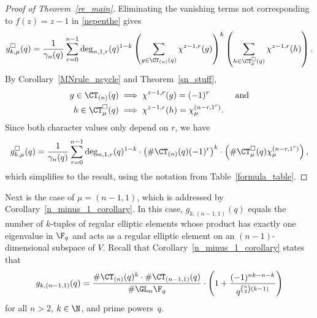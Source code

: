 \begin{proof}[Proof of Theorem~\ref{re_main}]
Eliminating the vanishing terms not corresponding to \(f(z) = z-1\) in \eqref{nepenthe} gives
\[
g_{k,\mu}^\Box (q)
=
\frac{1}{\gamma_n(q)}
\sum_{r = 0}^{n-1}
\deg_{n,1,r}(q)^{1-k}
\left (
\sum_{g \in \CT_{(n)} (q)} \chi^{z-1,r} (g)
\right )^k
\left (
\sum_{h \in \CT_\mu^\Box (q)} \chi^{z-1,r} (h)
\right ).
\]
By
Corollary~\ref{MNrule_ncycle}
and
Theorem~\ref{sn_stuff},
\begin{align*}
g \in \CT_{(n)} (q) & \implies \chi^{z-1,r}(g) = (-1)^r \quad \quad \quad \text{and}\\
h \in \CT_\mu^\Box (q)   & \implies \chi^{z-1,r}(h) = \chi^{(n-r,1^r)}_\mu.
\end{align*}
Since both character values only depend on \(r\), we have
\[
g_{k,\mu}^\Box (q)
=
\frac{1}{\gamma_n(q)}
\sum_{r = 0}^{n-1}
\deg_{n,1,r}(q)^{1-k}
\cdot
\left (
\# \CT_{(n)} (q) (-1)^r
\right )^k
\cdot
\left (
\# \CT_\mu^\Box (q) \chi^{(n-r,1^r)}_\mu
\right ),
\]
which simplifies to the result, using the notation from Table~\ref{formula_table}.
\end{proof}







































Next is the case of \(\mu = (n-1,1)\), which is addressed by Corollary~\ref{n_minus_1_corollary}.
In this case, \(g_{k,(n-1,1)} (q)\) equals the number of \(k\)-tuples of regular elliptic elements whose product has exactly one eigenvalue in \(\F_q\) and acts as a regular elliptic element on an \((n-1)\)-dimensional subspace of \(V\).
Recall that Corollary~\ref{n_minus_1_corollary} states that
\begin{equation}
g_{k,(n-1,1)} (q)
=
\frac{\# \CT_{(n)} (q)^k
\cdot
\# \CT_{(n-1,1)} (q)}{\# \GL_n \F_q}
\cdot
\left (
1 + \frac{(-1)^{nk-n-k}}{q^{\binom{n}{2}(k-1)}}
\right )
\end{equation}
for all \(n > 2\), \(k \in \N\), and prime powers~\(q\).


